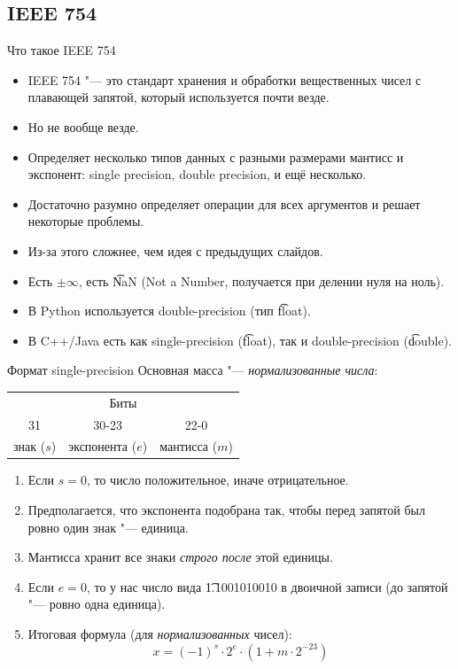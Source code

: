 \subsection{IEEE 754}
\begin{frame}
\end{frame}

\begin{frame}{Что такое IEEE 754}
	\begin{itemize}
		\item
			IEEE 754 "--- это стандарт хранения и обработки вещественных чисел с плавающей запятой, который используется почти везде.
		\item
			Но не вообще везде.
		\item
			Определяет несколько типов данных с разными размерами мантисс и экспонент: single precision, double precision, и ещё несколько.
		\item
			Достаточно разумно определяет операции для всех аргументов и решает некоторые проблемы.
		\item
			Из-за этого сложнее, чем идея с предыдущих слайдов.
		\item
			Есть $\pm \infty$, есть \t{NaN} (Not a Number, получается при делении нуля на ноль).
		\item
			В Python используется double-precision (тип \t{float}).
		\item
			В C++/Java есть как single-precision (\t{float}), так и double-precision (\t{double}).
	\end{itemize}
\end{frame}

\begin{frame}{Формат single-precision}
	Основная масса "--- \textit{нормализованные числа}:
	\begin{center}
		\begin{tabular}{c|c|c}
			\multicolumn{3}{c}{Биты} \\
			31 & 30-23 & 22-0 \\\hline
			знак ($s$) & экспонента ($e$) & мантисса ($m$) \\
		\end{tabular}
	\end{center}
	\begin{enumerate}
		\item
			Если $s=0$, то число положительное, иначе отрицательное.
		\item
			Предполагается, что экспонента подобрана так, чтобы перед запятой был ровно один знак "--- единица.
		\item
			Мантисса хранит все знаки \textit{строго после} этой единицы.
		\item
			Если $e=0$, то у нас число вида \t{1.1001010010} в двоичной записи (до запятой "--- ровно одна единица).
		\item
			Итоговая формула (для \textit{нормализованных} чисел):
			\[ x = (-1)^s \cdot 2^{e} \cdot (1 + m \cdot 2^{-23}) \]
	\end{enumerate}
\end{frame}

